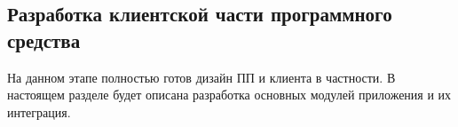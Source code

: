 \subsection{Разработка клиентской части программного средства}
\label{sec:development:client}

На данном этапе полностью готов дизайн ПП и клиента в частности. В настоящем разделе будет описана разработка основных модулей приложения и их интеграция.




